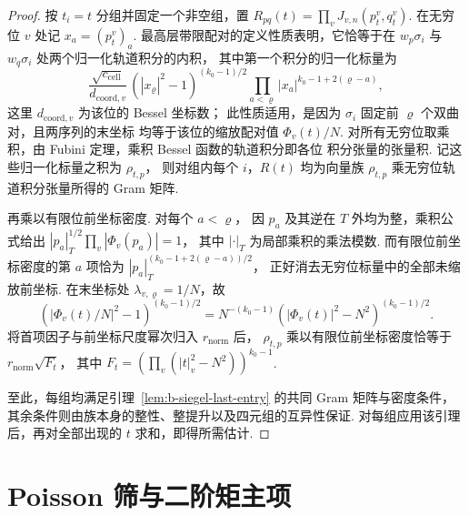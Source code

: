 \begin{proof}
按 $t_i=t$ 分组并固定一个非空组，置
$R_{pq}(t)=\prod_v J_{v,n}(p^v_t,q^v_t)$.
在无穷位 $v$ 处记 $x_a=(p^v_t)_a$.
最高层带限配对的定义性质表明，它恰等于在 $w_p\sigma_i$ 与
$w_q\sigma_i$ 处两个归一化轨道积分的内积，
其中第一个积分的归一化标量为
\[
  \frac{\sqrt{c_{\mathrm{cell}}}}{d_{\mathrm{coord},v}}\,
  (|x_\varrho|^2-1)^{(k_0-1)/2}
  \prod_{a<\varrho}|x_a|^{k_0-1+2(\varrho-a)},
\]
这里 $d_{\mathrm{coord},v}$ 为该位的 Bessel 坐标数；
此性质适用，是因为 $\sigma_i$ 固定前 $\varrho$ 个双曲对，且两序列的末坐标
均等于该位的缩放配对值 $\Phi_v(t)/N$.
对所有无穷位取乘积，由 Fubini 定理，乘积 Bessel 函数的轨道积分即各位
积分张量的张量积. 记这些归一化标量之积为 $\rho_{t,p}$，
则对组内每个 $i$，$R(t)$ 均为向量族
$\rho_{t,p}$ 乘无穷位轨道积分张量所得的 Gram 矩阵.

再乘以有限位前坐标密度. 对每个 $a<\varrho$，
因 $p_a$ 及其逆在 $T$ 外均为整，乘积公式给出
$|p_a|_T^{1/2}\prod_v|\Phi_v(p_a)|=1$，
其中 $|\cdot|_T$ 为局部乘积的乘法模数.
而有限位前坐标密度的第 $a$ 项恰为
$|p_a|_T^{(k_0-1+2(\varrho-a))/2}$，
正好消去无穷位标量中的全部未缩放前坐标.
在末坐标处 $\lambda_{v,\varrho}=1/N$，故
\[
 (|\Phi_v(t)/N|^2-1)^{(k_0-1)/2}
 =N^{-(k_0-1)}(|\Phi_v(t)|^2-N^2)^{(k_0-1)/2}.
\]
将首项因子与前坐标尺度幂次归入 $r_{\mathrm{norm}}$ 后，
$\rho_{t,p}$ 乘以有限位前坐标密度恰等于 $r_{\mathrm{norm}}\sqrt{F_t}$，
其中 $F_t=(\prod_v(|t|_v^2-N^2))^{k_0-1}$.

至此，每组均满足引理~\ref{lem:b-siegel-last-entry} 的共同 Gram 矩阵与密度条件，
其余条件则由族本身的整性、整提升以及四元组的互异性保证.
对每组应用该引理后，再对全部出现的 $t$ 求和，即得所需估计.
\end{proof}

\section{Poisson 筛与二阶矩主项}
\label{sec:b-poisson}

